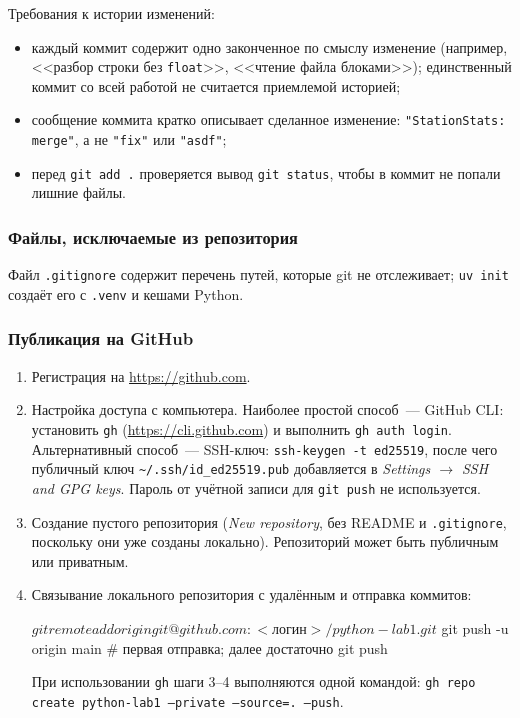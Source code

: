 \documentclass[11pt,a4paper]{article}
\newcommand{\code}[1]{\texttt{#1}}
\begin{document}
Требования к истории изменений:
\begin{itemize}
  \item каждый коммит содержит одно законченное по смыслу изменение (например, <<разбор строки
        без \code{float}>>, <<чтение файла блоками>>); единственный коммит со всей работой
        не считается приемлемой историей;
  \item сообщение коммита кратко описывает сделанное изменение: \code{"StationStats: merge"},
        а не \code{"fix"} или \code{"asdf"};
  \item перед \code{git add .} проверяется вывод \code{git status}, чтобы в коммит не попали лишние файлы.
\end{itemize}

\subsubsection*{Файлы, исключаемые из репозитория}

Файл \code{.gitignore} содержит перечень путей, которые git не отслеживает; \code{uv init}
создаёт его с \code{.venv} и кешами Python.

\subsubsection*{Публикация на GitHub}

\begin{enumerate}
  \item Регистрация на \url{https://github.com}.
  \item Настройка доступа с компьютера. Наиболее простой способ~— GitHub CLI: установить \code{gh}
        (\url{https://cli.github.com}) и выполнить \code{gh auth login}. Альтернативный способ~—
        SSH-ключ: \code{ssh-keygen -t ed25519}, после чего публичный ключ
        \code{\textasciitilde/.ssh/id\_ed25519.pub} добавляется в \emph{Settings $\to$ SSH and GPG keys}.
        Пароль от учётной записи для \code{git push} не используется.
  \item Создание пустого репозитория (\emph{New repository}, без README и \code{.gitignore},
        поскольку они уже созданы локально). Репозиторий может быть публичным или приватным.
  \item Связывание локального репозитория с удалённым и отправка коммитов:
\begin{shell}
$ git remote add origin git@github.com:<логин>/python-lab1.git
$ git push -u origin main          # первая отправка; далее достаточно git push
\end{shell}
        При использовании \code{gh} шаги 3--4 выполняются одной командой:
        \code{gh repo create python-lab1 --private --source=. --push}.
\end{enumerate}
\end{document}
